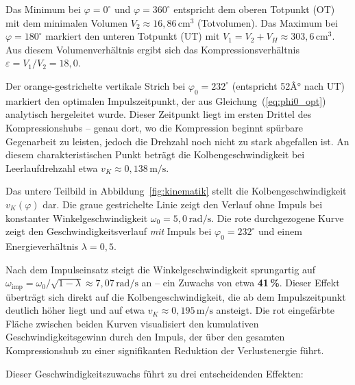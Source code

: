 ﻿\documentclass[a4paper,12pt]{article}
\begin{document}
Das Minimum bei $\varphi = 0^\circ$ und $\varphi = 360^\circ$ entspricht
dem oberen Totpunkt (OT) mit dem minimalen Volumen $V_2 \approx 16{,}86\,\text{cm}^3$
(Totvolumen). Das Maximum bei $\varphi = 180^\circ$ markiert den unteren
Totpunkt (UT) mit $V_1 = V_2 + V_H \approx 303{,}6\,\text{cm}^3$. Aus diesem
Volumenverhältnis ergibt sich das Kompressionsverhältnis $\varepsilon = V_1/V_2 = 18{,}0$.

Der orange-gestrichelte vertikale Strich bei $\varphi_0 = 232^\circ$
(entspricht 52Â° nach UT) markiert den optimalen Impulszeitpunkt, der aus
Gleichung~(\ref{eq:phi0_opt}) analytisch hergeleitet wurde. Dieser Zeitpunkt
liegt im ersten Drittel des Kompressionshubs -- genau dort, wo die Kompression
beginnt spürbare Gegenarbeit zu leisten, jedoch die Drehzahl noch nicht
zu stark abgefallen ist. An diesem charakteristischen Punkt beträgt die
Kolbengeschwindigkeit bei Leerlaufdrehzahl etwa $v_K \approx 0{,}138\,\text{m/s}$.

Das untere Teilbild in Abbildung~\ref{fig:kinematik} stellt die Kolbengeschwindigkeit
$v_K(\varphi)$ dar. Die graue gestrichelte Linie zeigt den Verlauf ohne Impuls
bei konstanter Winkelgeschwindigkeit $\omega_0 = 5{,}0\,\text{rad/s}$. Die rote
durchgezogene Kurve zeigt den Geschwindigkeitsverlauf \textit{mit} Impuls bei
$\varphi_0 = 232^\circ$ und einem Energieverhältnis $\lambda = 0{,}5$.

Nach dem Impulseinsatz steigt die Winkelgeschwindigkeit sprungartig auf
$\omega_\text{imp} = \omega_0 / \sqrt{1-\lambda} \approx 7{,}07\,\text{rad/s}$
an -- ein Zuwachs von etwa \textbf{41\,\%}. Dieser Effekt überträgt sich direkt auf die
Kolbengeschwindigkeit, die ab dem Impulszeitpunkt deutlich höher liegt und
auf etwa $v_K \approx 0{,}195\,\text{m/s}$ ansteigt. Die rot eingefärbte Fläche
zwischen beiden Kurven visualisiert den kumulativen Geschwindigkeitsgewinn durch
den Impuls, der über den gesamten Kompressionshub zu einer signifikanten
Reduktion der Verlustenergie führt.

Dieser Geschwindigkeitszuwachs führt zu drei entscheidenden Effekten:
\end{document}
